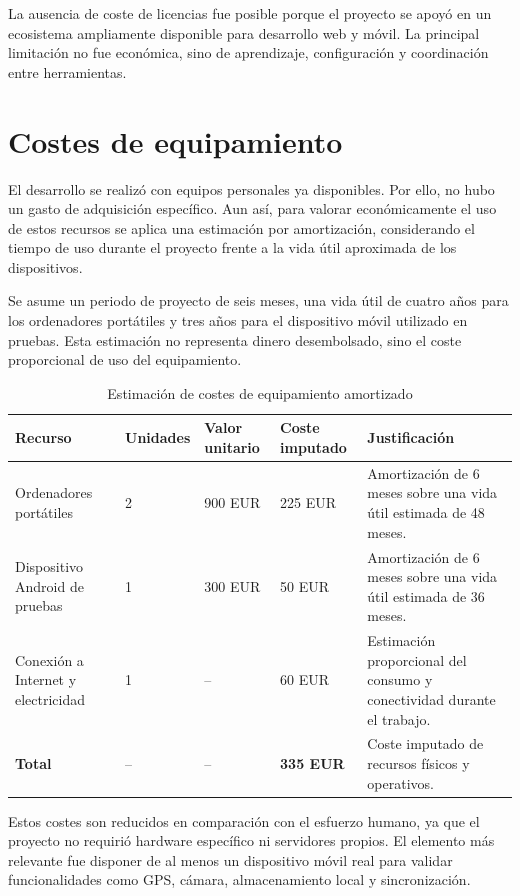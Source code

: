La ausencia de coste de licencias fue posible porque el proyecto se apoyó en un
ecosistema ampliamente disponible para desarrollo web y móvil. La principal
limitación no fue económica, sino de aprendizaje, configuración y coordinación
entre herramientas.

\section{Costes de equipamiento}

El desarrollo se realizó con equipos personales ya disponibles. Por ello, no hubo
un gasto de adquisición específico. Aun así, para valorar económicamente el uso de
estos recursos se aplica una estimación por amortización, considerando el tiempo de
uso durante el proyecto frente a la vida útil aproximada de los dispositivos.

Se asume un periodo de proyecto de seis meses, una vida útil de cuatro años para
los ordenadores portátiles y tres años para el dispositivo móvil utilizado en
pruebas. Esta estimación no representa dinero desembolsado, sino el coste
proporcional de uso del equipamiento.

\begin{table}[H]
\centering
\caption{Estimación de costes de equipamiento amortizado}
\label{tab:costes_equipamiento}
\small
\renewcommand{\arraystretch}{1.18}
\begin{tabularx}{\textwidth}{p{3.7cm}p{2.0cm}p{2.7cm}p{2.6cm}X}
\toprule
\textbf{Recurso} & \textbf{Unidades} & \textbf{Valor unitario} & \textbf{Coste imputado} & \textbf{Justificación} \\
\midrule
Ordenadores portátiles & 2 & 900 EUR & 225 EUR & Amortización de 6 meses sobre una vida útil estimada de 48 meses. \\
Dispositivo Android de pruebas & 1 & 300 EUR & 50 EUR & Amortización de 6 meses sobre una vida útil estimada de 36 meses. \\
Conexión a Internet y electricidad & 1 & -- & 60 EUR & Estimación proporcional del consumo y conectividad durante el trabajo. \\
\midrule
\textbf{Total} & -- & -- & \textbf{335 EUR} & Coste imputado de recursos físicos y operativos. \\
\bottomrule
\end{tabularx}
\end{table}

Estos costes son reducidos en comparación con el esfuerzo humano, ya que el
proyecto no requirió hardware específico ni servidores propios. El elemento más
relevante fue disponer de al menos un dispositivo móvil real para validar
funcionalidades como GPS, cámara, almacenamiento local y sincronización.

